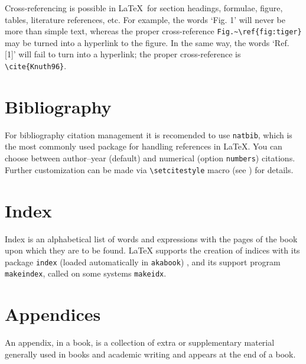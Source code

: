 \documentclass{ltxdoc}
\def\file#1{\texttt{#1}}
\begin{document}
Cross-referencing is possible in \LaTeX\ for section headings, formulae, figure, tables, 
literature references, etc. For example, the words `Fig. 1' will never be more than simple 
text, whereas the proper cross-reference \verb!Fig.~\ref{fig:tiger}! may be turned into a 
hyperlink to the figure. In the same way, the words `Ref. [1]' will fail to turn into a 
hyperlink; the proper cross-reference is \verb!\cite{Knuth96}!.


\section{Bibliography}

For bibliography citation management it is recomended to use \file{natbib},
which 
is the most commonly used package for handling references in LaTeX.
You can choose between author--year (default) and numerical (option \verb!numbers!) citations.
Further customization 
can be made via \verb!\setcitestyle! macro (see \cite{ref:natbib}) for details.

\section{Index}

Index is an alphabetical list of words and 
expressions with the pages of the book upon which they are to be found. 
LaTeX supports the creation of indices with its package \file{index} (loaded automatically in \file{akabook}) \cite{ref:index}, 
and its support program \file{makeindex}, called on some systems \file{makeidx}.


\section{Appendices}

An appendix, in a book, is a collection of extra or supplementary material 
generally used in books and academic writing and appears at the end of a book.
 


%
\end{document}

